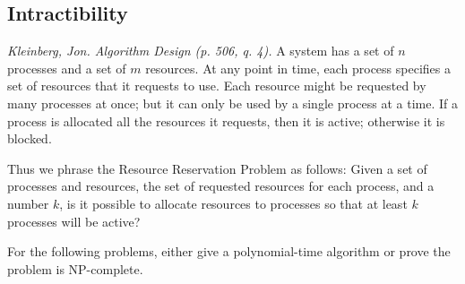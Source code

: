 \documentclass[solutionorbox,answers]{exam}
\begin{document}
\begin{center}
\end{center}
\vspace{0.1in}
 \qquad
{}

\begin{questions}

\section*{Intractibility}

\question  \textit{Kleinberg, Jon. Algorithm Design (p. 506, q. 4).} A system has a set of $n$ processes and a set of $m$ resources. 
At any point in time, each process specifies a set of resources that it requests to use. 
Each resource might be requested by many processes at once; but it can only be used by a single process at a time. 
If a process is allocated all the resources it requests, then it is active; otherwise it is blocked. 

Thus we phrase the Resource Reservation Problem as follows: 
Given a set of processes and resources, the set of requested resources for each process, and a number $k$, is it possible to allocate resources to processes so that at least $k$ processes will be active?

For the following problems, either give a polynomial-time algorithm or prove the problem is NP-complete.

\end{questions}
\end{document}
